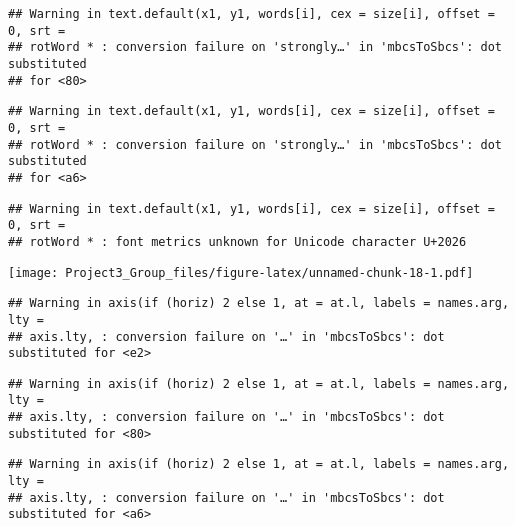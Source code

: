 \documentclass[]{article}
\newenvironment{Shaded}{\begin{snugshade}}{\end{snugshade}}
\newcommand{\DataTypeTok}[1]{\textcolor[rgb]{0.13,0.29,0.53}{#1}}
\newcommand{\DecValTok}[1]{\textcolor[rgb]{0.00,0.00,0.81}{#1}}
\newcommand{\KeywordTok}[1]{\textcolor[rgb]{0.13,0.29,0.53}{\textbf{#1}}}
\newcommand{\NormalTok}[1]{#1}
\newcommand{\OperatorTok}[1]{\textcolor[rgb]{0.81,0.36,0.00}{\textbf{#1}}}
\newcommand{\StringTok}[1]{\textcolor[rgb]{0.31,0.60,0.02}{#1}}
\begin{document}
\begin{verbatim}
## Warning in text.default(x1, y1, words[i], cex = size[i], offset = 0, srt =
## rotWord * : conversion failure on 'strongly…' in 'mbcsToSbcs': dot substituted
## for <80>
\end{verbatim}

\begin{verbatim}
## Warning in text.default(x1, y1, words[i], cex = size[i], offset = 0, srt =
## rotWord * : conversion failure on 'strongly…' in 'mbcsToSbcs': dot substituted
## for <a6>
\end{verbatim}

\begin{verbatim}
## Warning in text.default(x1, y1, words[i], cex = size[i], offset = 0, srt =
## rotWord * : font metrics unknown for Unicode character U+2026
\end{verbatim}

\texttt{[image: Project3\_Group\_files/figure-latex/unnamed-chunk-18-1.pdf]}

\begin{Shaded}
\end{Shaded}

\begin{verbatim}
## Warning in axis(if (horiz) 2 else 1, at = at.l, labels = names.arg, lty =
## axis.lty, : conversion failure on '…' in 'mbcsToSbcs': dot substituted for <e2>
\end{verbatim}

\begin{verbatim}
## Warning in axis(if (horiz) 2 else 1, at = at.l, labels = names.arg, lty =
## axis.lty, : conversion failure on '…' in 'mbcsToSbcs': dot substituted for <80>
\end{verbatim}

\begin{verbatim}
## Warning in axis(if (horiz) 2 else 1, at = at.l, labels = names.arg, lty =
## axis.lty, : conversion failure on '…' in 'mbcsToSbcs': dot substituted for <a6>
\end{verbatim}
\end{document}

